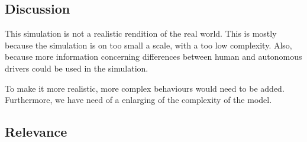 

\subsection{Discussion}
\label{sub:conclusion:discussion}




This simulation is not a realistic rendition of the real world. This is mostly because the simulation is on too small a scale, with a too low complexity.
 Also, because more information concerning differences between human and autonomous drivers could be used in the simulation. 

To make it more realistic, more complex behaviours would need to be added. Furthermore, we have need of a enlarging of the complexity of the model.


\subsection{Relevance}
\label{sub:conclusion:relevance}
